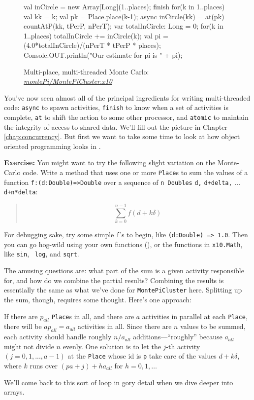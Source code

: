 \begin{figure}[!htbp]
\begin{xtennum}[]
{{      val inCircle = new Array[Long](1..places);
      finish for(k in 1..places) {
         val kk = k;
         val pk = Place.place(k-1);
         async inCircle(kk) = at(pk) countAtP(kk, tPerP, nPerT);
      }
      var totalInCircle: Long = 0;
      for(k in 1..places) {
         totalInCircle += inCircle(k);
      }
      val pi = (4.0*totalInCircle)/(nPerT * tPerP * places);
      Console.OUT.println("Our estimate for pi is " + pi);
   }
}
\end{xtennum}
\hrulefill
\caption{Multi-place, multi-threaded Monte Carlo:
\href{http://dist.codehaus.org/x10/documentation/guide/src/montePi/MontePiCluster.x10}{\em
montePi/MontePiCluster.x10}}\label{fig:mpmtmc}
\end{figure}

You've now seen almost all of the principal ingredients for writing multi-threaded
\Xten{} code: {\tt async} to spawn activities, {\tt finish} to know when a
set of activities is complete, {\tt at} to shift the action to some other
processor, and {\tt atomic} to maintain the integrity of access to shared
data.  We'll fill out the picture in Chapter \ref{chap:concurrency}.
But first we want to take some time to look at how object oriented
programming looks in \Xten.

{\bf Exercise:} You might want to try the following slight variation on the Monte-Carlo
code.   Write a method that
uses one or more {\tt Place}s to sum the values of a function  {\tt f:(d:Double)=>Double} over a 
sequence of {\tt n Doubles}  {\tt d,} {\tt d+delta,} ... {\tt d+n*delta}:

\begin{quote}\begin{equation}
\sum_{k=0}^{n-1}  f(d + k\delta)
\end{equation}
\end{quote}

For debugging sake, try some simple {\tt f}'s to begin, like {\tt (d:Double) =>
1.0}.  Then you can go hog-wild using your own functions (), or the functions in {\tt x10.Math}, like {\tt sin}, {\tt
log}, and {\tt sqrt}.

The amusing questions are: what part of the sum is a given activity responsible for,
and how do we combine the partial results?  Combining the results is essentially
the same as what we've done for {\tt MontePiCluster} here.  Splitting up the
sum, though, requires some thought.  Here's one approach:

If there are $p_{all}$ {\tt Place}s in all, and there are $a$ activities
in parallel at each {\tt Place}, there will be $ap_{all} = a_{all}$
activities in all. Since there are
$n$ values to be summed, each activity should handle roughly $n/a_{all}$
additions---``roughly'' because $a_{all}$ might not divide $n$ evenly.
One solution is to let the $j$-th
activity $( j=0,1,...,a-1)$ at the {\tt Place} whose id is {\tt p}  take care of the values 
$d+k\delta$, where $k$ runs over $(p a+j)+h a_{all}$ for $h = 0,1,\dots$

We'll come back to this sort of loop in gory detail when we dive deeper into \Xten{} arrays.
